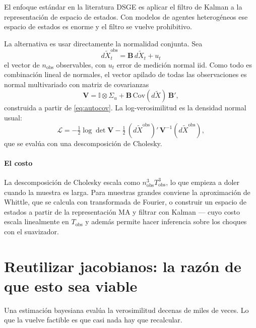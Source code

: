 El enfoque estándar en la literatura DSGE es aplicar el filtro de Kalman a la
representación de espacio de estados. Con modelos de agentes heterogéneos ese
espacio de estados es enorme y el filtro se vuelve prohibitivo.

La alternativa es usar directamente la normalidad conjunta. Sea
\begin{equation}
d\tilde{X}^{\text{obs}}_t = \mathbf{B}\, d\tilde{X}_t + u_t
\end{equation}
el vector de $n_{\text{obs}}$ observables, con $u_t$ error de medición normal iid.
Como todo es combinación lineal de normales, el vector apilado de todas las
observaciones es normal multivariado con matriz de covarianzas
\begin{equation}
\mathbf{V} = \mathbb{I}\otimes\Sigma_u + \mathbf{B}\,\mathrm{Cov}(d\tilde{X})\,\mathbf{B}',
\end{equation}
construida a partir de \eqref{eq:autocov}. La log-verosimilitud es la densidad
normal usual:
\begin{equation}
\mathcal{L} = -\tfrac12 \log\det \mathbf{V}
-\tfrac12\,(d\tilde{X}^{\text{obs}})'\,\mathbf{V}^{-1}(d\tilde{X}^{\text{obs}}),
\end{equation}
que se evalúa con una descomposición de Cholesky.

\paragraph{El costo} La descomposición de Cholesky escala como
$n_{\text{obs}}^3 T_{\text{obs}}^3$, lo que empieza a doler cuando la muestra es
larga. Para muestras grandes conviene la aproximación de Whittle, que se calcula
con transformada de Fourier, o construir un espacio de estados a partir de la
representación MA y filtrar con Kalman --- cuyo costo escala linealmente en
$T_{\text{obs}}$ y además permite hacer inferencia sobre los choques con el
suavizador.

\section{Reutilizar jacobianos: la razón de que esto sea viable}

Una estimación bayesiana evalúa la verosimilitud decenas de miles de veces. Lo
que la vuelve factible es que casi nada hay que recalcular.


